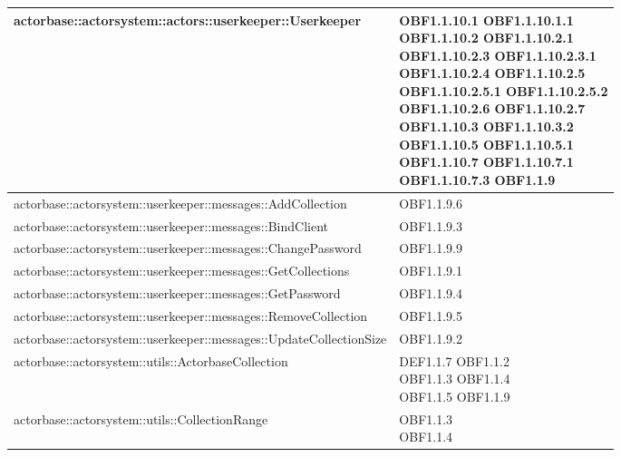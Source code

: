 \documentclass{scalatekids-article}
\begin{document}
\begin{longtable}[H]{|p{12cm}|p{5.5cm}|}
  \hline
  actorbase::actorsystem::actors::userkeeper::Userkeeper & \multiLineCell[t]{OBF1.1.10.1 OBF1.1.10.1.1\\OBF1.1.10.2 OBF1.1.10.2.1\\OBF1.1.10.2.3 OBF1.1.10.2.3.1\\OBF1.1.10.2.4 OBF1.1.10.2.5\\OBF1.1.10.2.5.1 OBF1.1.10.2.5.2\\OBF1.1.10.2.6 OBF1.1.10.2.7\\OBF1.1.10.3 OBF1.1.10.3.2\\OBF1.1.10.5 OBF1.1.10.5.1\\OBF1.1.10.7 OBF1.1.10.7.1\\OBF1.1.10.7.3 OBF1.1.9\\}\\
  \hline
  actorbase::actorsystem::userkeeper::messages::AddCollection & \multiLineCell[t]{OBF1.1.9.6\\}\\
  \hline
  actorbase::actorsystem::userkeeper::messages::BindClient & \multiLineCell[t]{OBF1.1.9.3\\}\\
  \hline
  actorbase::actorsystem::userkeeper::messages::ChangePassword & \multiLineCell[t]{OBF1.1.9.9\\}\\
  \hline
  actorbase::actorsystem::userkeeper::messages::GetCollections & \multiLineCell[t]{OBF1.1.9.1\\}\\
  \hline
  actorbase::actorsystem::userkeeper::messages::GetPassword & \multiLineCell[t]{OBF1.1.9.4\\}\\
  \hline
  actorbase::actorsystem::userkeeper::messages::RemoveCollection & \multiLineCell[t]{OBF1.1.9.5\\}\\
  \hline
  actorbase::actorsystem::userkeeper::messages::UpdateCollectionSize & \multiLineCell[t]{OBF1.1.9.2\\}\\
  \hline
  actorbase::actorsystem::utils::ActorbaseCollection & \multiLineCell[t]{DEF1.1.7 OBF1.1.2\\OBF1.1.3 OBF1.1.4\\OBF1.1.5 OBF1.1.9\\}\\
  \hline
  actorbase::actorsystem::utils::CollectionRange & \multiLineCell[t]{OBF1.1.3\\OBF1.1.4\\}\\

\end{longtable}
\end{document}

